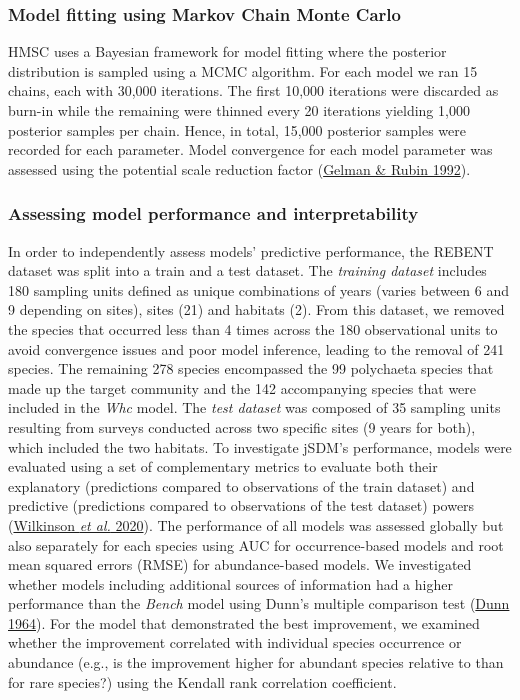\documentclass[9pt,biorxiv,doublespacing,lineno,endfloat]{lapreprint}
\begin{document}
\hypertarget{model-fitting-using-markov-chain-monte-carlo}{%
\subsubsection{Model fitting using Markov Chain Monte
Carlo}\label{model-fitting-using-markov-chain-monte-carlo}}

HMSC uses a Bayesian framework for model fitting where the posterior
distribution is sampled using a MCMC algorithm. For each model we ran 15
chains, each with 30,000 iterations. The first 10,000 iterations were
discarded as burn-in while the remaining were thinned every 20
iterations yielding 1,000 posterior samples per chain. Hence, in total,
15,000 posterior samples were recorded for each parameter. Model
convergence for each model parameter was assessed using the potential
scale reduction factor (\protect\hyperlink{ref-Gelman_1992}{Gelman \&
Rubin 1992}).

\hypertarget{assessing-model-performance-and-interpretability}{%
\subsubsection{Assessing model performance and
interpretability}\label{assessing-model-performance-and-interpretability}}

In order to independently assess models' predictive performance, the
REBENT dataset was split into a train and a test dataset. The
\emph{training dataset} includes 180 sampling units defined as unique
combinations of years (varies between 6 and 9 depending on sites), sites
(21) and habitats (2). From this dataset, we removed the species that
occurred less than 4 times across the 180 observational units to avoid
convergence issues and poor model inference, leading to the removal of
241 species. The remaining 278 species encompassed the 99 polychaeta
species that made up the target community and the 142 accompanying
species that were included in the \emph{Whc} model. The \emph{test
dataset} was composed of 35 sampling units resulting from surveys
conducted across two specific sites (9 years for both), which included
the two habitats. To investigate jSDM's performance, models were
evaluated using a set of complementary metrics to evaluate both their
explanatory (predictions compared to observations of the train dataset)
and predictive (predictions compared to observations of the test
dataset) powers (\protect\hyperlink{ref-Wilkinson_2020}{Wilkinson
\emph{et al.} 2020}). The performance of all models was assessed
globally but also separately for each species using AUC for
occurrence-based models and root mean squared errors (RMSE) for
abundance-based models. We investigated whether models including
additional sources of information had a higher performance than the
\emph{Bench} model using Dunn's multiple comparison test
(\protect\hyperlink{ref-Dunn_1964}{Dunn 1964}). For the model that
demonstrated the best improvement, we examined whether the improvement
correlated with individual species occurrence or abundance (e.g., is the
improvement higher for abundant species relative to than for rare
species?) using the Kendall rank correlation coefficient.
\end{document}
